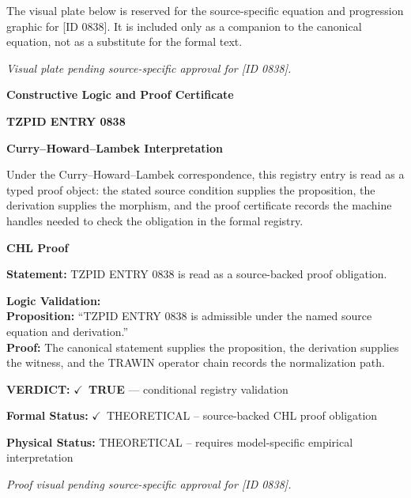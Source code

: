 \begingroup\footnotesize\sloppy
The visual plate below is reserved for the source-specific equation and progression graphic for [ID 0838]. It is included only as a companion to the canonical equation, not as a substitute for the formal text.
\par\endgroup
\begingroup\footnotesize\itshape
Visual plate pending source-specific approval for [ID 0838].
\par\endgroup

\clearpage
\begingroup\tzpsupportsetup
\noindent\textbf{\fontsize{10.8pt}{12.8pt}\selectfont [ID 0838] Constructive Logic and Proof Certificate}\par
\noindent\textbf{\fontsize{10pt}{12pt}\selectfont TZPID ENTRY 0838}\par
\vspace{0.45em}
\begingroup
\footnotesize
\setlength{\parskip}{0.22em}
\setlength{\parindent}{0pt}
\noindent\textbf{Curry--Howard--Lambek Interpretation}\par
Under the Curry--Howard--Lambek correspondence, this registry entry is read as a typed proof
object: the stated source condition supplies the proposition, the derivation supplies the
morphism, and the proof certificate records the machine handles needed to check the obligation
in the formal registry.

\vspace{0.45em}
\noindent\textbf{CHL Proof}\par
\textbf{Statement:} TZPID ENTRY 0838 is read as a source-backed proof obligation.

\textbf{Logic Validation:}\\
\textbf{Proposition:} ``TZPID ENTRY 0838 is admissible under the named source equation and derivation.''\\
\textbf{Proof:} The canonical statement supplies the proposition, the derivation supplies the witness, and the TRAWIN operator chain records the normalization path.

\textbf{VERDICT:} \ensuremath{\checkmark}\ \textbf{TRUE} --- conditional registry validation

\textbf{Formal Status:} \ensuremath{\checkmark}\ THEORETICAL -- source-backed CHL proof obligation

\textbf{Physical Status:} THEORETICAL -- requires model-specific empirical interpretation
\par\vspace{0.45em}
\par
\vfill
\begingroup\footnotesize\itshape
Proof visual pending source-specific approval for [ID 0838].
\par\endgroup
\vfill
\endgroup
\endgroup
